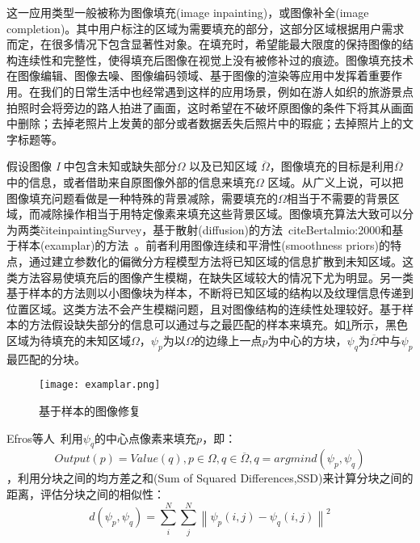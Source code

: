 这一应用类型一般被称为图像填充(image inpainting)，或图像补全(image completion)。其中用户标注的区域为需要填充的部分，这部分区域根据用户需求而定，在很多情况下包含显著性对象。在填充时，希望能最大限度的保持图像的结构连续性和完整性，使得填充后图像在视觉上没有被修补过的痕迹。图像填充技术在图像编辑、图像去噪、图像编码领域、基于图像的渲染等应用中发挥着重要作用。在我们的日常生活中也经常遇到这样的应用场景，例如在游人如织的旅游景点拍照时会将旁边的路人拍进了画面，这时希望在不破坏原图像的条件下将其从画面中删除；去掉老照片上发黄的部分或者数据丢失后照片中的瑕疵；去掉照片上的文字标题等。\par
假设图像 \emph{I} 中包含未知或缺失部分\(\Omega\) 以及已知区域 \(\overline{\Omega}\)，图像填充的目标是利用\(\overline{\Omega}\)中的信息，或者借助来自原图像外部的信息来填充\(\Omega\) 区域。从广义上说，可以把图像填充问题看做是一种特殊的背景减除，需要填充的\(\Omega\)相当于不需要的背景区域，而减除操作相当于用特定像素来填充这些背景区域。图像填充算法大致可以分为两类\~cite{inpaintingSurvey}，基于散射(diffusion)的方法~cite{Bertalmio:2000}和基于样本(examplar)的方法~\cite{Criminisi04regionfilling}。前者利用图像连续和平滑性(smoothness priors)的特点，通过建立参数化的偏微分方程模型方法将已知区域的信息扩散到未知区域。这类方法容易使填充后的图像产生模糊，在缺失区域较大的情况下尤为明显。另一类基于样本的方法则以小图像块为样本，不断将已知区域的结构以及纹理信息传递到位置区域。这类方法不会产生模糊问题，且对图像结构的连续性处理较好。基于样本的方法假设缺失部分的信息可以通过与之最匹配的样本来填充。如\ref{fig:examplar}所示，黑色区域为待填充的未知区域\(\Omega\)，$\psi_{p}$为以\(\Omega\)的边缘上一点$p$为中心的方块，$\psi_{q}$为\(\overline{\Omega}\)中与$\psi_{p}$最匹配的分块。
\begin{figure}[h]
  \centering%
      {\texttt{[image: examplar.png]}}
  \caption{基于样本的图像修复}
  \label{fig:examplar}
\end{figure}
Efros等人~\cite{Efros}利用$\psi_{q}$的中心点像素来填充$p$，即：
$$Output(p)=Value(q),p\in \Omega, q\in \overline{\Omega},q=arg min d(\psi_{p},\psi_{q})$$
，利用分块之间的均方差之和(Sum of  Squared Differences,SSD)来计算分块之间的距离，评估分块之间的相似性：
$$d(\psi_{p},\psi_{q})=\sum_{i}^{N}\sum_{j}^{N}\left \| \psi_{p}(i,j)-\psi_{q}(i,j) \right \|^{2}$$
